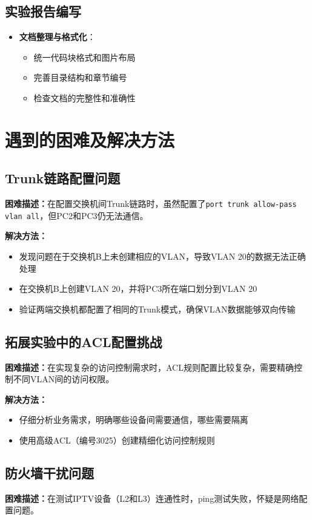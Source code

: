 \documentclass[a4paper]{article}
\begin{document}
\subsection{实验报告编写}
\begin{itemize}
    \item \textbf{文档整理与格式化}：
    \begin{itemize}
        \item 统一代码块格式和图片布局
        \item 完善目录结构和章节编号
        \item 检查文档的完整性和准确性
    \end{itemize}
\end{itemize}

\section{遇到的困难及解决方法}

\subsection{Trunk链路配置问题}
\textbf{困难描述：}在配置交换机间Trunk链路时，虽然配置了\lstinline{port trunk allow-pass vlan all}，但PC2和PC3仍无法通信。

\textbf{解决方法：}
\begin{itemize}
    \item 发现问题在于交换机B上未创建相应的VLAN，导致VLAN 20的数据无法正确处理
    \item 在交换机B上创建VLAN 20，并将PC3所在端口划分到VLAN 20
    \item 验证两端交换机都配置了相同的Trunk模式，确保VLAN数据能够双向传输
\end{itemize}

\subsection{拓展实验中的ACL配置挑战}
\textbf{困难描述：}在实现复杂的访问控制需求时，ACL规则配置比较复杂，需要精确控制不同VLAN间的访问权限。

\textbf{解决方法：}
\begin{itemize}
    \item 仔细分析业务需求，明确哪些设备间需要通信，哪些需要隔离
    \item 使用高级ACL（编号3025）创建精细化访问控制规则
\end{itemize}

\subsection{防火墙干扰问题}
\textbf{困难描述：}在测试IPTV设备（L2和L3）连通性时，ping测试失败，怀疑是网络配置问题。
\end{document}

